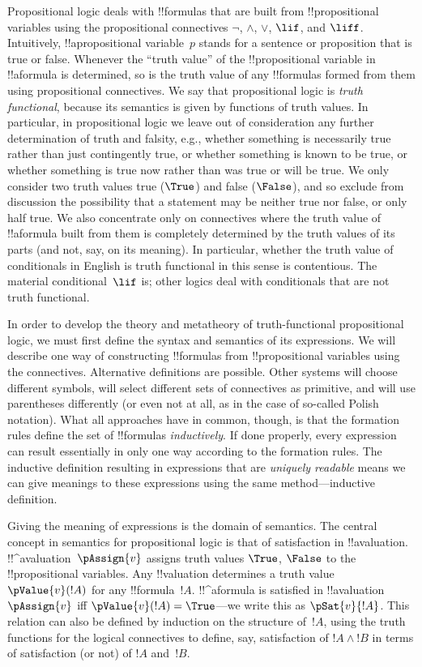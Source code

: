 \documentclass[../../../include/open-logic-section]{subfiles}
\begin{document}

Propositional logic deals with !!{formula}s that are built from
!!{propositional variable}s using the propositional connectives
$\lnot$, $\land$, $\lor$, $\lif$, and $\liff$.  Intuitively,
!!a{propositional variable}~$p$ stands for a sentence or proposition
that is true or false. Whenever the ``truth value'' of the
!!{propositional variable} in !!a{formula} is determined, so is the
truth value of any !!{formula}s formed from them using propositional
connectives.  We say that propositional logic is \emph{truth
  functional}, because its semantics is given by functions of truth
values. In particular, in propositional logic we leave out of
consideration any further determination of truth and falsity, e.g.,
whether something is necessarily true rather than just contingently
true, or whether something is known to be true, or whether something
is true now rather than was true or will be true.  We only consider
two truth values true ($\True$) and false ($\False$), and so exclude
from discussion the possibility that a statement may be neither true
nor false, or only half true. We also concentrate only on connectives where
the truth value of !!a{formula} built from them is completely
determined by the truth values of its parts (and not, say, on its
meaning). In particular, whether the truth value of conditionals in
English is truth functional in this sense is contentious. The material
conditional~$\lif$ is; other logics deal with conditionals that are
not truth functional.

In order to develop the theory and metatheory of truth-functional
propositional logic, we must first define the syntax and semantics of
its expressions.  We will describe one way of constructing
!!{formula}s from !!{propositional variable}s using the connectives.
Alternative definitions are possible. Other systems will choose
different symbols, will select different sets of connectives as
primitive, and will use parentheses differently (or even not at all,
as in the case of so-called Polish notation).  What all approaches
have in common, though, is that the formation rules define the set of
!!{formula}s \emph{inductively}. If done properly, every expression
can result essentially in only one way according to the formation
rules.  The inductive definition resulting in expressions that are
\emph{uniquely readable} means we can give meanings to these
expressions using the same method---inductive definition.

Giving the meaning of expressions is the domain of semantics.  The
central concept in semantics for propositional logic is that of
satisfaction in !!a{valuation}. !!^a{valuation}~$\pAssign{v}$ assigns
truth values $\True$, $\False$ to the !!{propositional variable}s. Any
!!{valuation} determines a truth value $\pValue{v}(!A)$ for any
!!{formula}~$!A$.  !!^a{formula} is satisfied in
!!a{valuation}~$\pAssign{v}$ iff $\pValue{v}(!A) = \True$---we write
this as $\pSat{v}{!A}$. This relation can also be defined by induction on
the structure of~$!A$, using the truth functions for the logical
connectives to define, say, satisfaction of $!A \land !B$ in terms of
satisfaction (or not) of $!A$ and~$!B$.
\end{document}

